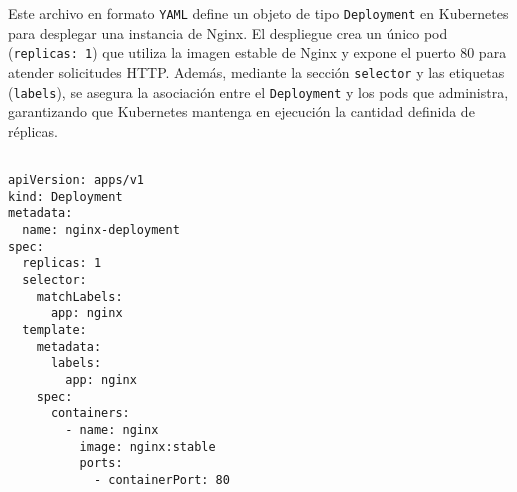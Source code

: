 Este archivo en formato \texttt{YAML} define un objeto de tipo \texttt{Deployment} en Kubernetes para desplegar una instancia de Nginx. El despliegue crea un único pod (\texttt{replicas: 1}) que utiliza la imagen estable de Nginx y expone el puerto 80 para atender solicitudes HTTP. Además, mediante la sección \texttt{selector} y las etiquetas (\texttt{labels}), se asegura la asociación entre el \texttt{Deployment} y los pods que administra, garantizando que Kubernetes mantenga en ejecución la cantidad definida de réplicas.

\begin{verbatim}

apiVersion: apps/v1
kind: Deployment
metadata:
  name: nginx-deployment
spec:
  replicas: 1
  selector:
    matchLabels:
      app: nginx
  template:
    metadata:
      labels:
        app: nginx
    spec:
      containers:
        - name: nginx
          image: nginx:stable
          ports:
            - containerPort: 80

\end{verbatim}